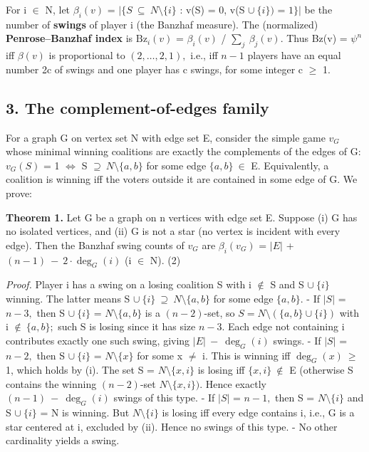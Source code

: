 \documentclass[
]{article}
\begin{document}
For i \(\in\) N, let \(\beta_i(v)\) =
\(\vert\{S\ \subseteq\ N\setminus\{i\}\) : v(S) = 0, v(S
\(\cup\ \{i\})\) = \(1\}\vert\) be the number of \textbf{swings} of
player i (the Banzhaf measure). The (normalized)
\textbf{Penrose--Banzhaf index} is \(\mathrm{Bz}_i(v)\) = \(\beta_i(v)\)
/ \(\sum_j\ \beta_j(v).\) Thus Bz(v) = \(\psi^n\) iff \(\beta(v)\) is
proportional to \((2,\dots,2,1),\) i.e., iff \(n-1\) players have an
equal number 2c of swings and one player has c swings, for some integer
c \(\ge\) 1.

\subsection{3. The complement-of-edges
family}\label{the-complement-of-edges-family}

For a graph G on vertex set N with edge set E, consider the simple game
\(v_G\) whose minimal winning coalitions are exactly the complements of
the edges of G: \(v_G(S)\) = 1 \(\iff\) S
\(\supseteq\ N\setminus\{a,b\}\) for some edge \(\{a,b\}\ \in\) E.
Equivalently, a coalition is winning iff the voters outside it are
contained in some edge of G. We prove:

\textbf{Theorem 1.} Let G be a graph on n vertices with edge set E.
Suppose (i) G has no isolated vertices, and (ii) G is not a star (no
vertex is incident with every edge). Then the Banzhaf swing counts of
\(v_G\) are \(\beta_i(v_G)\) = \(\vert E\vert\) +
\((n-1)\ -\ 2\cdot\deg_G(i)\) (i \(\in\) N). (2)

\emph{Proof.} Player i has a swing on a losing coalition S with i
\(\notin\) S and S \(\cup\ \{i\}\) winning. The latter means S
\(\cup\ \{i\}\ \supseteq\ N\setminus\{a,b\}\) for some edge \(\{a,b\}.\)
- If \(\vert S\vert\) = \(n-3,\) then S \(\cup\ \{i\}\) =
\(N\setminus\{a,b\}\) is a \((n-2)\)-set, so
\(S = N \setminus (\{a,b\} \cup \{i\})\) with i \(\notin\ \{a,b\};\)
such S is losing since it has size \(n-3.\) Each edge not containing i
contributes exactly one such swing, giving
\(\vert E\vert\ -\ \deg_G(i)\) swings. - If \(\vert S\vert\) = \(n-2,\)
then S \(\cup\ \{i\}\) = \(N\setminus\{x\}\) for some x \(\ne\) i. This
is winning iff \(\deg_G(x)\ \ge\) 1, which holds by (i). The set S =
\(N\setminus\{x,i\}\) is losing iff \(\{x,i\}\ \notin\) E (otherwise S
contains the winning \((n-2)\)-set \(N\setminus\{x,i\}).\) Hence exactly
\((n-1)\ -\ \deg_G(i)\) swings of this type. - If \(\vert S\vert\) =
\(n-1,\) then S = \(N\setminus\{i\}\) and S \(\cup\ \{i\}\) = N is
winning. But \(N\setminus\{i\}\) is losing iff every edge contains i,
i.e., G is a star centered at i, excluded by (ii). Hence no swings of
this type. - No other cardinality yields a swing.
\end{document}
